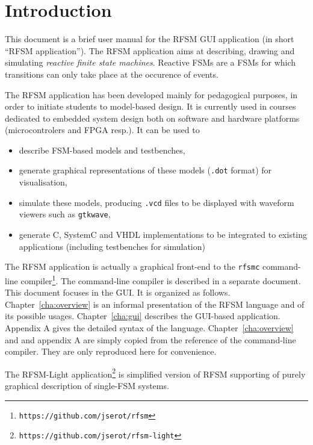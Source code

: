 \chapter{Introduction}
\label{chap:intro}

This document is a brief user manual for the RFSM GUI application (in short ``RFSM application'').
The RFSM application aims at describing, drawing and simulating \emph{reactive finite state
  machines}. Reactive FSMs are a FSMs for which transitions can only take place at the occurence of
events.

\medskip
The RFSM application has been developed mainly for pedagogical purposes, in order to initiate students to
model-based design. It is currently used in courses dedicated to embedded system design both on
software and hardware platforms (microcontrolers and FPGA resp.). It can be used to

\begin{itemize}
\item describe FSM-based models and testbenches,
\item generate graphical representations of these models (\verb|.dot| format) for visualisation,
\item simulate these models, producing \verb|.vcd| files to be displayed with waveform viewers such
  as \texttt{gtkwave},
\item generate C, SystemC and VHDL implementations to be integrated to existing applications
  (including testbenches for simulation)
\end{itemize}

\medskip The RFSM application is actually a graphical front-end to the \verb|rfsmc| command-line
compiler\footnote{\texttt{https://github.com/jserot/rfsm}}.  The command-line compiler is described
in a separate document. This document focuses in the GUI. It is organized as follows.
Chapter~\ref{cha:overview} is an informal presentation of the RFSM language and of its possible
usages. Chapter~\ref{cha:gui} describes the GUI-based application. Appendix A gives the detailed
syntax of the language.  Chapter~\ref{cha:overview} and and appendix A are simply copied from the
reference of the command-line compiler. They are only reproduced here for convenience.

\medskip
The RFSM-Light application\footnote{\texttt{https://github.com/jserot/rfsm-light}} is simplified
version of RFSM supporting of purely graphical description of single-FSM systems.

